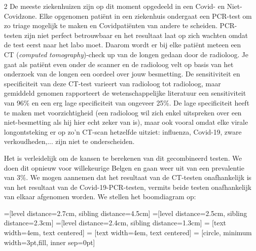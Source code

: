 \begin{multicols}{2}
De meeste ziekenhuizen zijn op dit moment opgedeeld in een Covid- en Niet-Covidzone. Elke opgenomen patiënt in een ziekenhuis ondergaat een PCR-test om zo triage mogelijk te maken en Covidpatiënten van andere te scheiden. PCR-testen zijn niet perfect betrouwbaar en het resultaat laat op zich wachten omdat de test eerst naar het labo moet. Daarom wordt er bij elke patiënt meteen een CT (\textit{computed tomography})-check up van de longen gedaan door de radioloog. Je gaat als patiënt even onder de scanner en de radioloog velt op basis van het onderzoek van de longen een oordeel over jouw besmetting. De sensitiviteit en specificiteit van deze CT-test varieert van radioloog tot radioloog, maar gemiddeld genomen rapporteert de wetenschappelijke literatuur een sensitiviteit van 96\% en een erg lage specificiteit van ongeveer 25\%. De lage specificiteit heeft te maken met voorzichtigheid (een radioloog wil zich enkel uitspreken over een niet-besmetting als hij hier echt zeker van is), maar ook vooral omdat elke virale longontsteking er op zo’n CT-scan hetzelfde uitziet: influenza, Covid-19, zware verkoudheden,... zijn niet te onderscheiden.

Het is verleidelijk om de kansen te berekenen van dit gecombineerd testen. We doen dit opnieuw voor willekeurige Belgen en gaan weer uit van een prevalentie van $3\%$. We mogen aannemen dat het resultaat van de CT-testen  onafhankelijk is van het resultaat van de Covid-19-PCR-testen, vermits beide testen onafhankelijk van elkaar afgenomen worden. We stellen het boomdiagram op:
\end{multicols}
=[level distance=2.7cm, sibling distance=4.5cm]
=[level distance=2.5cm, sibling distance=2.3cm]
=[level distance=2.4cm, sibling distance=1.3cm]
 = [text width=4em, text centered]
 = [text width=4em, text centered]
 = [circle, minimum width=3pt,fill, inner sep=0pt]
